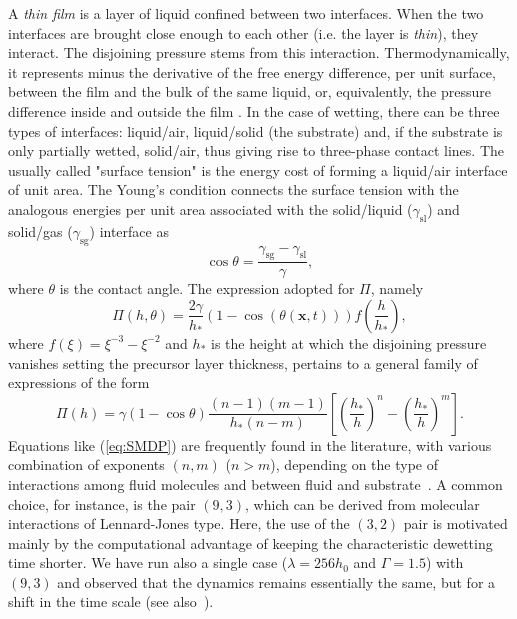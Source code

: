 \documentclass[amsmath,amssymb,showpacs,prf,superscriptaddress,notitlepage,longbibliography]{revtex4-1}
\begin{document}
\noindent A {\it thin film} is a layer of liquid confined between two interfaces. When the two interfaces are brought close enough to each other (i.e. the layer is {\it thin}), they interact.
The disjoining pressure stems from this interaction. Thermodynamically, it represents minus the derivative of the free energy difference, per unit surface, between 
the film and the bulk of the same liquid, or, equivalently, the pressure difference inside and outside the film \cite{Deryaguin1940,DeryaguinChuraev1978}.
In the case of wetting, there can be three types of interfaces: liquid/air, liquid/solid (the substrate) and, if the substrate is only partially wetted, solid/air, thus giving rise to three-phase contact lines. 
The usually called "surface tension" is the energy cost of forming a liquid/air interface of unit area. 
The Young's condition \cite{youngIIIEssayCohesion1805,degennesWettingStaticsDynamics1985} connects the surface tension with the analogous energies per unit area associated with the solid/liquid ($\gamma_{\text{sl}}$) and solid/gas ($\gamma_{\text{sg}}$) interface as
\begin{equation}
\cos \theta = \frac{\gamma_{\text{sg}}-\gamma_{\text{sl}}}{\gamma},
\end{equation}
where $\theta$ is the contact angle.
The expression adopted for $\Pi$, namely
\begin{equation}
\Pi(h,\theta) = \frac{2\gamma}{h_{\ast}}(1-\cos(\theta(\mathbf{x},t)))
  f\left(\frac{h}{h_{\ast}}\right),
\end{equation}
where $f(\xi)=\xi^{-3} - \xi^{-2}$ and $h_{\ast}$ is the height at which the disjoining pressure vanishes setting the precursor layer thickness, pertains to a general family of expressions of the form 
\begin{equation}\label{eq:SMDP}
\Pi(h) = \gamma(1-\cos \theta)\frac{(n-1)(m-1)}{h_{\ast}(n-m)}\left[\left(\frac{h_{\ast}}{h}\right)^n - 
\left(\frac{h_{\ast}}{h}\right)^m\right].
\end{equation}
Equations like (\ref{eq:SMDP}) are frequently found in the literature, with various combination of exponents $(n,m)$ ($n>m$), depending on the type of interactions among fluid molecules and between fluid and substrate~\cite{schwartzSimulationDropletMotion1998,mitlinDewettingSolidSurface1993,teletzkeHowLiquidsSpread1987}. 
A common choice, for instance, is the pair $(9,3)$, which can be derived from molecular interactions of Lennard-Jones type. 
Here, the use of the $(3,2)$ pair is motivated mainly by the computational advantage of keeping the characteristic dewetting time shorter. 
We have run also a single case ($\lambda=256 h_0$ and $\Gamma=1.5$) with $(9,3)$ and observed that the dynamics remains essentially the same, but for a shift in the time scale (see also~\cite{zitzLatticeBoltzmannSimulations2021}).
\end{document}
